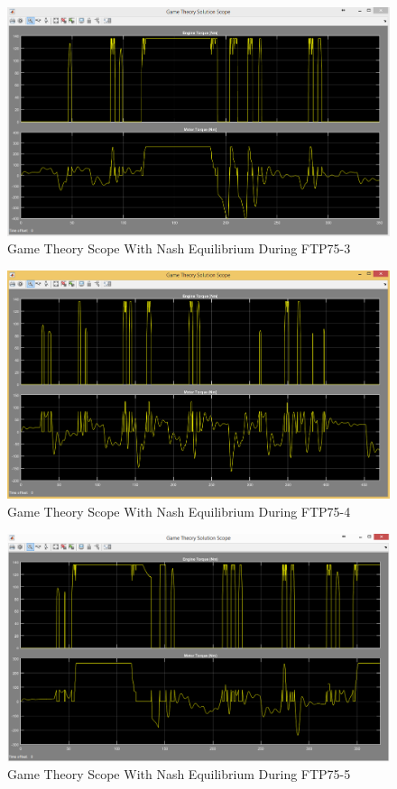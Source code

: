\begin{figure}[h]
\centering
\includegraphics[scale=0.49]{figures/NashEquilibrium/FTP75-3/gameTheory15Juni}
\caption{Game Theory Scope With Nash Equilibrium During FTP75-3}
\label{fig:gtne3}
\end{figure}


\begin{figure}[h]
\centering
\includegraphics[scale=0.49]{figures/NashEquilibrium/FTP75-4/gameTheory15Juni}
\caption{Game Theory Scope With Nash Equilibrium During FTP75-4}
\label{fig:gtne4}
\end{figure}


\begin{figure}[h]
\centering
\includegraphics[scale=0.49]{figures/NashEquilibrium/FTP75-5/gameTheory16Juni}
\caption{Game Theory Scope With Nash Equilibrium During FTP75-5}
\label{fig:gtne5}
\end{figure}


